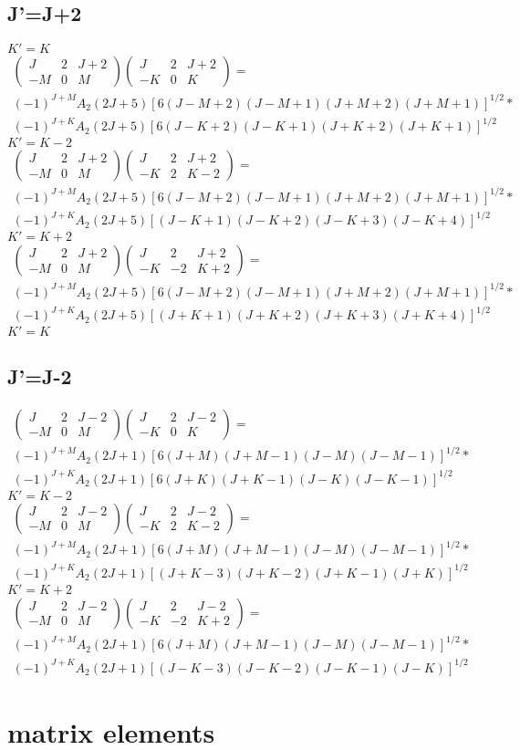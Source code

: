 \documentclass{article}
\newcommand{\wigner}[6]{\begin{pmatrix}{#1}&{#2}&{#3}\\{#4}&{#5}&{#6}\end{pmatrix}}
\begin{document}
\subsection{J'=J+2}
$K'=K$
\begin{align*}
\wigner{J}{2}{J+2}{-M}{0}{M}\wigner{J}{2}{J+2}{-K}{0}{K}=\\(-1)^{J+M}A_2(2J+5)[6(J-M+2)(J-M+1)(J+M+2)(J+M+1)]^{1/2}*\\(-1)^{J+K}A_2(2J+5)[6(J-K+2)(J-K+1)(J+K+2)(J+K+1)]^{1/2}
\end{align*}
$K'=K-2$
\begin{align*}
\wigner{J}{2}{J+2}{-M}{0}{M}\wigner{J}{2}{J+2}{-K}{2}{K-2}=\\(-1)^{J+M}A_2(2J+5)[6(J-M+2)(J-M+1)(J+M+2)(J+M+1)]^{1/2}*\\(-1)^{J+K}A_2(2J+5)[(J-K+1)(J-K+2)(J-K+3)(J-K+4)]^{1/2}
\end{align*}
$K'=K+2$
\begin{align*}
\wigner{J}{2}{J+2}{-M}{0}{M}\wigner{J}{2}{J+2}{-K}{-2}{K+2}=\\(-1)^{J+M}A_2(2J+5)[6(J-M+2)(J-M+1)(J+M+2)(J+M+1)]^{1/2}*\\(-1)^{J+K}A_2(2J+5)[(J+K+1)(J+K+2)(J+K+3)(J+K+4)]^{1/2}
\end{align*}
$K'=K$
\subsection{J'=J-2}
\begin{align*}
\wigner{J}{2}{J-2}{-M}{0}{M}\wigner{J}{2}{J-2}{-K}{0}{K}=\\(-1)^{J+M}A_2(2J+1)[6(J+M)(J+M-1)(J-M)(J-M-1)]^{1/2}*\\(-1)^{J+K}A_2(2J+1)[6(J+K)(J+K-1)(J-K)(J-K-1)]^{1/2}
\end{align*}
$K'=K-2$
\begin{align*}
\wigner{J}{2}{J-2}{-M}{0}{M}\wigner{J}{2}{J-2}{-K}{2}{K-2}=\\(-1)^{J+M}A_2(2J+1)[6(J+M)(J+M-1)(J-M)(J-M-1)]^{1/2}*\\(-1)^{J+K}A_2(2J+1)[(J+K-3)(J+K-2)(J+K-1)(J+K)]^{1/2}
\end{align*}
$K'=K+2$
\begin{align*}
\wigner{J}{2}{J-2}{-M}{0}{M}\wigner{J}{2}{J-2}{-K}{-2}{K+2}=\\(-1)^{J+M}A_2(2J+1)[6(J+M)(J+M-1)(J-M)(J-M-1)]^{1/2}*\\(-1)^{J+K}A_2(2J+1)[(J-K-3)(J-K-2)(J-K-1)(J-K)]^{1/2}
\end{align*}
\section{matrix elements}
\end{document}
